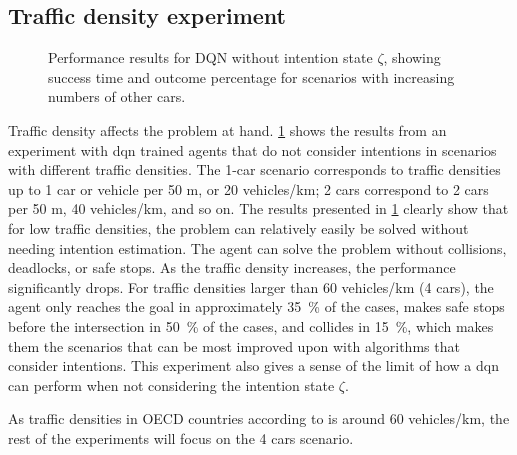 \subsection{Traffic density experiment}

\begin{figure}[!h]
    \centering
        
        \vspace{-0.8cm}
        \caption{Performance results for DQN without intention state $\zeta$, showing success time and outcome percentage for scenarios with increasing numbers of other cars.}
    \label{fig:number_cars}
\end{figure}

Traffic density affects the problem at hand. \ref{fig:number_cars} shows the results from an experiment with \gls{dqn} trained agents that do not consider intentions in scenarios with different traffic densities. The 1-car scenario corresponds to traffic densities up to 1 car or vehicle per 50 m, or 20 vehicles/km; 2 cars correspond to 2 cars per 50 m, 40 vehicles/km, and so on. The results presented in \ref{fig:number_cars} clearly show that for low traffic densities, the problem can relatively easily be solved without needing intention estimation. The agent can solve the problem without collisions, deadlocks, or safe stops. As the traffic density increases, the performance significantly drops. For traffic densities larger than 60 vehicles/km (4 cars), the agent only reaches the goal in approximately \SI{35}{\percent} of the cases, makes safe stops before the intersection in \SI{50}{\percent} of the cases, and collides in \SI{15}{\percent}, which makes them the scenarios that can be most improved upon with algorithms that consider intentions. This experiment also gives a sense of the limit of how a \gls{dqn} can perform when not considering the intention state $\zeta$.

As traffic densities in OECD countries according to \cite{OECD} is around 60 vehicles/km, the rest of the experiments will focus on the 4 cars scenario. 


